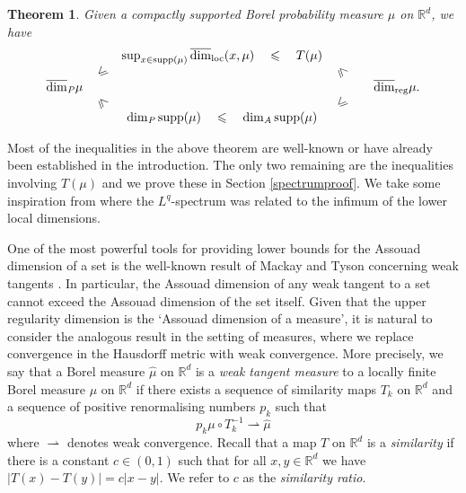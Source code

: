 \documentclass[12pt]{amsart}
\numberwithin{equation}{section}
\newtheorem{thm}{Theorem}[section]
\renewcommand{\leq}{\leqslant}
\renewcommand{\r}{\overline{\dim}_{\textup{reg}} \mu}
\begin{document}
\begin{thm} \label{relationships}
Given a compactly supported Borel probability measure $\mu$ on $\mathbb{R}^d$, we have
\[
\begin{array}{ccccccccccc}
                                                         &&                  \sup_ {x\in \mathrm{supp}(\mu)}  \overline{\dim}_{\mathrm{loc}}(x,\mu)   \quad  \leq    \quad   T(\mu)                        & & &    \\
&                       \rotatebox[origin=c]{45}{$\leq$}          & &              \rotatebox[origin=c]{315}{$\leq$} & &   \\
 \overline{\dim}_\text{\emph{P}} \mu                                            & &        &&                  & \r.\\
&                \rotatebox[origin=c]{315}{$\leq$}              &&           \rotatebox[origin=c]{45}{$\leq$} & &  \\
                         &&                                            \dim_\text{\emph{P}} \mathrm{supp}(\mu)      \quad  \leq   \quad  \dim_\text{\emph{A}} \mathrm{supp}(\mu)                           & & &  
\end{array}
\]
\end{thm}

Most of the inequalities in the above theorem are well-known or have already been established in the introduction.  The only two remaining are the  inequalities involving $T(\mu)$ and we prove these in Section \ref{spectrumproof}. We take some inspiration from \cite{fraser-jordan} where the $L^q$-spectrum was related to the infimum of the lower local dimensions.


One of the most powerful tools for providing lower bounds for the Assouad dimension of a set is the well-known result of Mackay and Tyson concerning weak tangents \cite[Proposition 6.1.5]{mackaytyson}.  In particular, the Assouad dimension of any weak tangent to a set cannot exceed the Assouad dimension of the set itself.  Given that the upper regularity dimension is the `Assouad dimension of a measure', it is natural to consider the analogous result in the setting of measures, where we replace convergence in the Hausdorff metric with weak convergence.  More precisely, we say that a Borel measure  $\hat{\mu}$ on  $ \mathbb{R}^d$ is a \emph{weak tangent measure} to  a locally finite Borel measure $\mu$ on $\mathbb{R}^d$ if there exists a sequence of similarity maps $T_k$ on  $\mathbb{R}^d$ and a sequence of positive renormalising numbers $p_k$ such that
\[
p_k \mu \circ T^{-1}_k  \rightharpoonup \hat{\mu}
\]
where $\rightharpoonup$ denotes weak convergence. Recall that a map $T$ on $\mathbb{R}^d$ is a \emph{similarity} if there is a constant $c  \in \left(0,1 \right)$ such that  for all $x,y \in \mathbb{R}^d$ we have $\lvert T(x)-T(y) \rvert= c\lvert x-y \rvert$.  We refer to $c$ as the \emph{similarity ratio}. 
\end{document}

